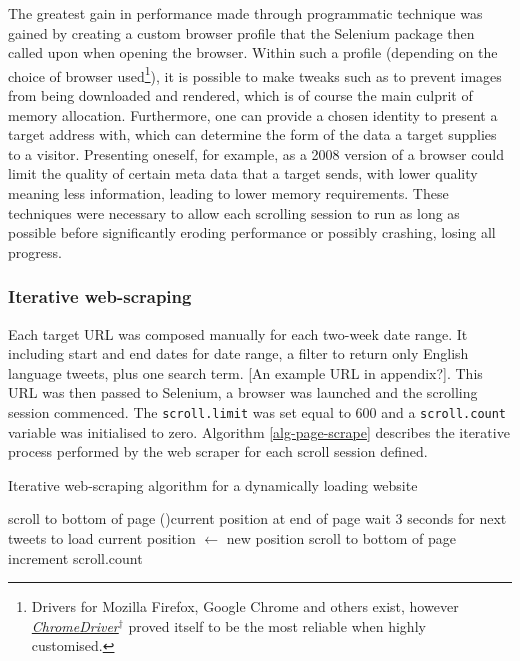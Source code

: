 \documentclass{article}
\begin{document}
The greatest gain in performance made through programmatic technique was gained by creating a custom browser profile that the Selenium package then called upon when opening the browser. Within such a profile (depending on the choice of browser used\footnote{Drivers for Mozilla Firefox, Google Chrome and others exist, however \href{https://sites.google.com/a/chromium.org/chromedriver/getting-started}{\emph{ChromeDriver$^{\dag{}}$}} proved itself to be the most reliable when highly customised.}), it is possible to make tweaks such as to prevent images from being downloaded and rendered, which is of course the main culprit of memory allocation. Furthermore, one can provide a chosen identity to present a target address with, which can determine the form of the data a target supplies to a visitor. Presenting oneself, for example, as a 2008 version of a browser could limit the quality of certain meta data that a target sends, with lower quality meaning less information, leading to lower memory requirements.
These techniques were necessary to allow each scrolling session to run as long as possible before significantly eroding performance or possibly crashing, losing all progress.


\subsubsection{Iterative web-scraping \label{iterative-scraping}}
\label{sec-1-3-3}

Each target URL was composed manually for each two-week date range. It including start and end dates for date range, a filter to return only English language tweets, plus one search term. [An example URL in appendix?]. This URL was then passed to Selenium, a browser was launched and the scrolling session commenced. The \texttt{scroll.limit} was set equal to 600 and a \texttt{scroll.count} variable was initialised to zero. Algorithm \eqref{alg-page-scrape} describes the iterative process performed by the web scraper for each scroll session defined.

\vspace{5mm}

\begin{algorithm}[H]
  \caption{Iterative web-scraping algorithm for a dynamically loading website}
  \label{alg-page-scrape}

  \BlankLine
  \BlankLine
  \BlankLine
  
   {
    scroll to bottom of page\;
    \eIf(){current position at end of page} {
      wait 3 seconds for next tweets to load\; 
      current position $\leftarrow$ new position\;
    } 
    {
      scroll to bottom of page\;
    }
    increment scroll.count
  }
  \BlankLine
  \BlankLine
   
\end{algorithm}
\end{document}
